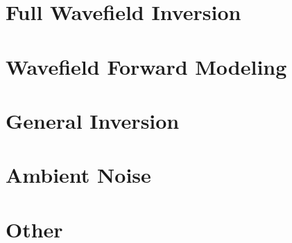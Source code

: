 \documentclass[aspectratio=169, 11pt, t]{beamer}
\newcommand{\secinctex}[1]{}
\begin{document}


\section[FWI]{Full Wavefield Inversion}

\secinctex{Tromp_2005_GJI_Adjoint-method}
\secinctex{Tape_2007_GJI_Adjoint-tomography-2D}
\secinctex{Louboutin_2017_EAGE_Gradient-sampling-algorithm}
\secinctex{Komatitsch_2016_GJI_Anelastic-kernels-with-parsimonious-storage}

\section[Modeling]{Wavefield Forward Modeling}

\section[Inversion]{General Inversion}
\secinctex{Sambridge_2001_IP_Neighborhood-algorithm}
\secinctex{Sambridge_2002_RG_Monte-Carlo-inversion}
\secinctex{Minson_2013_GJI_Bayesian-inversion-for-source}

\section[Noise]{Ambient Noise}
\secinctex{Sager_2018_GJI_Towards-FWANI}
\secinctex{Mordret_2014_GJI_Ambient-noise-surface-wave-tomography}

\section{Other}


\end{document}
